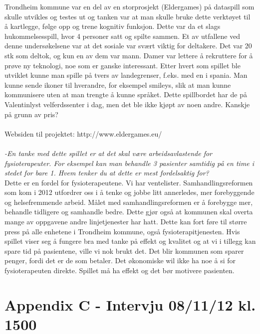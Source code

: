 Trondheim kommune var en del av en storprosjekt (Eldergames) på dataspill som skulle utvikles og testes ut og tanken var at man skulle bruke dette verktøyet til å kartlegge, følge opp og trene kognitiv funksjon. Dette var da et slags hukommelsesspill, hvor 
4 personer satt og spilte sammen. Et av utfallene ved denne undersøkelsene var at det sosiale var svært  viktig for deltakere. Det var 20 stk som deltok, og kun en av dem var mann. Damer var lettere å rekruttere for å prøve ny teknologi, noe som er ganske interessant. Etter hvert som spillet ble utviklet kunne man spille på tvers av landegrenser, f.eks. med en i spania. Man kunne sende ikoner til hverandre, for eksempel smileys, slik at man kunne kommunisere uten at man trengte å kunne språket. Dette spillbordet har de på Valentinlyst velferdssenter i dag, men det ble ikke kjøpt av noen andre. Kanskje på grunn av pris? \\ \\
Websiden til projektet: {http://www.eldergames.eu/} \\ \\
\emph{-En tanke med dette spillet er at det skal være arbeidsavlastende for fysioterapeuter. For eksempel kan man behandle 3 pasienter samtidig på en time i stedet for bare 1.  Hvem tenker du at dette er mest fordelsaktig for?}\\
Dette er en fordel for fysioterapeutene. Vi har ventelister. Samhandlingsreformen som kom i 2012 utfordrer oss i å tenke og jobbe litt annerledes, mer forebyggende og helsefremmende arbeid. Målet med samhandlingsreformen er å forebygge mer, behandle tidligere og samhandle bedre. Dette gjør også at kommunen skal overta mange av oppgavene andre linjetjenester har hatt. Dette kan fort føre til større press på alle enhetene i Trondheim kommune, også fysioterapitjenesten. Hvis spillet viser seg å fungere bra med tanke på effekt og kvalitet og at vi i tillegg kan spare tid på pasientene, ville vi nok brukt det. Det blir kommunen som sparer penger, fordi det er de som betaler. Det økonomiske wil ikke ha noe å si for fysioterapeuten direkte. Spillet må ha effekt og det bør motivere pasienten. 

\newpage
\section*{Appendix C - Intervju 08/11/12 kl. 1500}
\label{C}

